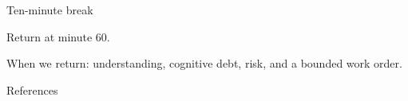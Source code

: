 \documentclass[t,aspectratio=169,11pt]{beamer}
\begin{document}
\begin{frame}
  \titlepage
\end{frame}




\begin{frame}
  \vfill
  \begin{center}
    {\LARGE\color{crimson}Ten-minute break}

    \vspace{1em}
    {\large Return at minute 60.}

    \vspace{1.2em}
    When we return: understanding, cognitive debt, risk, and a bounded work order.
  \end{center}
  \vfill
\end{frame}





\sectionoutlinesfalse
\begin{frame}{References}
  
  
\end{frame}
\end{document}
